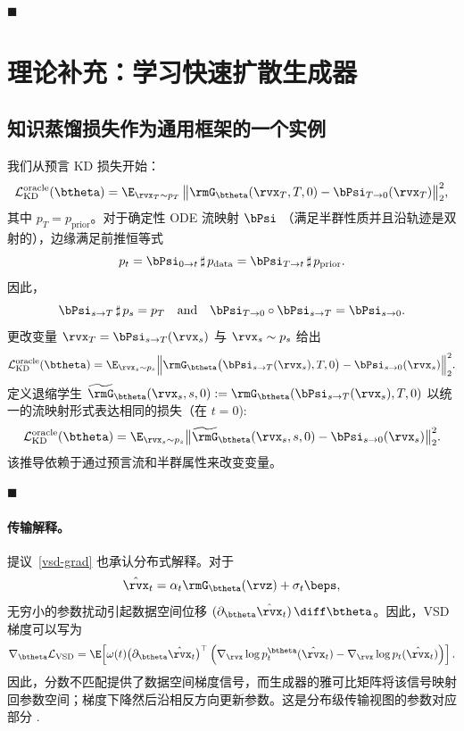 \hfill$\blacksquare$


\section{理论补充：学习快速扩散生成器}\label{app-sec:flow-map}

\subsection{知识蒸馏损失作为通用框架的一个实例 }

我们从预言 KD 损失开始：
\[
\mathcal{L}_{\mathrm{KD}}^{\text{oracle}}(\btheta)
=\E_{\rvx_T\sim p_T}\,
\big\|\rmG_\btheta(\rvx_T,T,0)-\bPsi_{T\to 0}(\rvx_T)\big\|_2^2,
\]
其中 $p_T = p_{\mathrm{prior}}$。对于确定性 ODE 流映射 $\bPsi$ （满足半群性质并且沿轨迹是双射的），边缘满足前推恒等式
\[
p_t
= \bPsi_{0\to t}\,\sharp\,p_{\mathrm{data}}
= \bPsi_{T\to t}\,\sharp\,p_{\mathrm{prior}}.
\]
因此，
\[
\bPsi_{s\to T}\,\sharp\,p_s=p_T
\quad\text{and}\quad
\bPsi_{T\to 0}\circ\bPsi_{s\to T}=\bPsi_{s\to 0}.
\]
更改变量 $\rvx_T=\bPsi_{s\to T}(\rvx_s)$ 与 $\rvx_s\sim p_s$ 给出
\[
\mathcal{L}_{\mathrm{KD}}^{\text{oracle}}(\btheta)
= \E_{\rvx_s\sim p_s}
\Big\|\rmG_\btheta \big(\bPsi_{s\to T}(\rvx_s),T,0\big)
- \bPsi_{s\to 0}(\rvx_s)\Big\|_2^2.
\]
定义退缩学生 $\widetilde{\rmG}_\btheta(\rvx_s,s,0):=
\rmG_\btheta(\bPsi_{s\to T}(\rvx_s),T,0)$ 以统一的流映射形式表达相同的损失（在 $t=0$):
\begin{align*}
\mathcal{L}_{\mathrm{KD}}^{\text{oracle}}(\btheta)
= \E_{\rvx_s\sim p_s}
\big\|\widetilde{\rmG}_\btheta(\rvx_s,s,0)-\bPsi_{s\to 0}(\rvx_s)\big\|_2^2.
\end{align*}
该推导依赖于通过预言流和半群属性来改变变量。

\hfill$\blacksquare$

\paragraph{传输解释。}
提议~\ref{vsd-grad} 也承认分布式解释。对于
\[
\hat\rvx_t
=
\alpha_t\rmG_\btheta(\rvz)+\sigma_t\beps,
\]
无穷小的参数扰动引起数据空间位移
$(\partial_\btheta\hat\rvx_t)\,\diff\btheta$。因此，VSD 梯度可以写为
\[
\nabla_{\btheta}\mathcal{L}_{\mathrm{VSD}}
=
\E\!\left[
\omega(t)
\big(\partial_\btheta\hat\rvx_t\big)^\top
\left(
\nabla_{\rvx}\log p_t^{\btheta}(\hat\rvx_t)
-
\nabla_{\rvx}\log p_t(\hat\rvx_t)
\right)
\right].
\]
因此，分数不匹配提供了数据空间梯度信号，而生成器的雅可比矩阵将该信号映射回参数空间；梯度下降然后沿相反方向更新参数。这是分布级传输视图的参数对应部分
.


